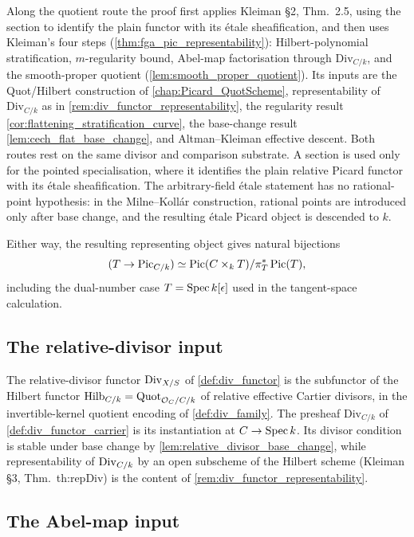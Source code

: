 Along the quotient route the proof first applies Kleiman \S 2, Thm.~2.5, using
the section to identify the plain functor with its \'etale sheafification, and
then uses Kleiman's four steps
(\cref{thm:fga_pic_representability}): Hilbert-polynomial stratification,
\(m\)-regularity bound, Abel-map factorisation through
\(\mathrm{Div}_{C/k}\), and the smooth-proper quotient
(\cref{lem:smooth_proper_quotient}). Its inputs are the Quot/Hilbert
construction of \cref{chap:Picard_QuotScheme}, representability of
\(\mathrm{Div}_{C/k}\) as in \cref{rem:div_functor_representability}, the
regularity result \cref{cor:flattening_stratification_curve}, the base-change
result \cref{lem:cech_flat_base_change}, and Altman--Kleiman effective descent.
Both routes rest on the same divisor and comparison substrate. A section is
used only for the pointed specialisation, where it identifies the plain
relative Picard functor with its \'etale sheafification. The arbitrary-field
\'etale statement has no rational-point hypothesis: in the Milne--Koll\'ar
construction, rational points are introduced only after base change, and the
resulting \'etale Picard object is descended to \(k\).

Either way, the resulting representing object gives
natural bijections
\[
  (T\to\operatorname{Pic}_{C/k})\simeq
  \operatorname{Pic}(C\times_kT)/\pi_T^*\operatorname{Pic}(T),
\]
including the dual-number case \(T=\operatorname{Spec} k[\epsilon]\) used in the
tangent-space calculation.

\subsection{The relative-divisor input}
\label{subsec:sorry_has_div_functor}

The relative-divisor functor \(\operatorname{Div}_{X/S}\) of
\cref{def:div_functor} is the subfunctor of the Hilbert functor
\(\operatorname{Hilb}_{C/k} = \operatorname{Quot}_{\mathcal{O}_C/C/k}\) of relative effective Cartier
divisors, in the invertible-kernel quotient encoding of
\cref{def:div_family}. The presheaf \(\mathrm{Div}_{C/k}\) of
\cref{def:div_functor_carrier} is its instantiation at
\(C\to\operatorname{Spec} k\). Its divisor condition is stable under base change by
\cref{lem:relative_divisor_base_change}, while representability of
\(\operatorname{Div}_{C/k}\) by an open subscheme of the Hilbert scheme (Kleiman \S 3,
Thm.~th:repDiv) is the content of
\cref{rem:div_functor_representability}.

\subsection{The Abel-map input}
\label{subsec:sorry_has_abel_map}

